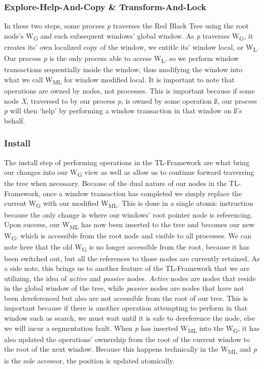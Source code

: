 \documentclass[letterpaper, 10 pt, conference]{ieeeconf}
\begin{document}
	 \subsubsection{Explore-Help-And-Copy \& Transform-And-Lock}
	 In these two steps, some process \textit{p} traverses the Red Black Tree using the root node's W\textsubscript{G} and each subsequent windows' global window. As \textit{p} traverses W\textsubscript{G}, it creates its' own localized copy of the window, we entitle its' window local, or W\textsubscript{L}. Our process \textit{p} is the only process able to access W\textsubscript{L}, so we perform window transactions sequentially inside the window, thus modifying the window into what we call W\textsubscript{ML} for window modified local. It is important to note that operations are owned by nodes, not processes. This is important because if some node \textit{X}, traversed to by our process \textit{p}, is owned by some operation ß, our process \textit{p} will then `help' by performing a window transaction in that window on ß's behalf.
	 \subsubsection{Install}
	 The install step of performing operations in the TL-Framework are what bring our changes into our W\textsubscript{G} view as well as allow us to continue forward traversing the tree when necessary. Because of the dual nature of our nodes in the TL-Framework, once a window transaction has completed we simply replace the current W\textsubscript{G} with our modified W\textsubscript{ML}. This is done in a single atomic instruction because the only change is where our windows' root pointer node is referencing. Upon success, our W\textsubscript{ML} has now been inserted to the tree and becomes our new W\textsubscript{G}, which is accessible from the root node and visible to all processes. We can note here that the old W\textsubscript{G} is no longer accessible from the root, because it has been switched out, but all the references to those nodes are currently retained. As a side note, this brings us to another feature of the TL-Framework that we are utilizing, the idea of \textit{active} and \textit{passive} nodes. \textit{Active} nodes are nodes that reside in the global window of the tree, while \textit{passive} nodes are nodes that have not been dereferenced but also are not accessible from the root of our tree. This is important because if there is another operation attempting to perform in that window such as search, we must wait until it is safe to dereference the node, else we will incur a segmentation fault. When \textit{p} has inserted W\textsubscript{ML} into the W\textsubscript{G}, it has also updated the operations' ownership from the root of the current window to the root of the next window. Because this happens technically in the W\textsubscript{ML} and \textit{p} is the sole accessor, the position is updated atomically.
\end{document}

